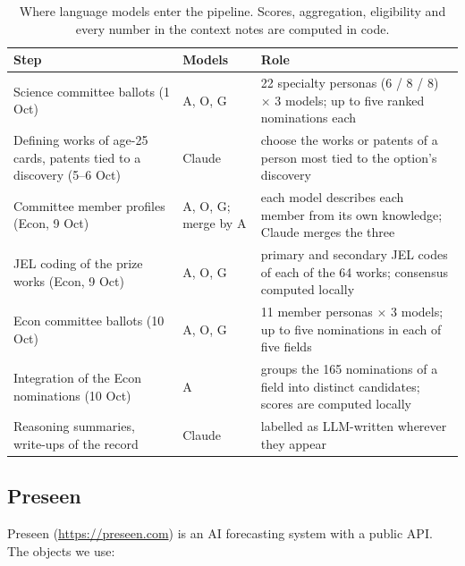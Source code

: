 \documentclass[11pt,a4paper]{article}
\begin{document}
\begin{table}[htbp]
\small
\begin{tabularx}{\textwidth}{@{}P{48mm}lL@{}}
\toprule
Step & Models & Role \\
\midrule
Science committee ballots (1 Oct) & A, O, G & 22 specialty personas (6 / 8 / 8) $\times$ 3 models; up to five ranked nominations each \\
Defining works of age-25 cards, patents tied to a discovery (5--6 Oct) & Claude & choose the works or patents of a person most tied to the option's discovery \\
Committee member profiles (Econ, 9 Oct) & A, O, G; merge by A & each model describes each member from its own knowledge; Claude merges the three \\
JEL coding of the prize works (Econ, 9 Oct) & A, O, G & primary and secondary JEL codes of each of the 64 works; consensus computed locally \\
Econ committee ballots (10 Oct) & A, O, G & 11 member personas $\times$ 3 models; up to five nominations in each of five fields \\
Integration of the Econ nominations (10 Oct) & A & groups the 165 nominations of a field into distinct candidates; scores are computed locally \\
Reasoning summaries, write-ups of the record & Claude & labelled as LLM-written wherever they appear \\
\bottomrule
\end{tabularx}
\caption{Where language models enter the pipeline. Scores, aggregation, eligibility and every number in the context notes are computed in code.}
\end{table}

\subsection{Preseen}\label{sec:preseen-service}

Preseen (\url{https://preseen.com}) is an AI forecasting system with a public API. The objects we use:
\end{document}

